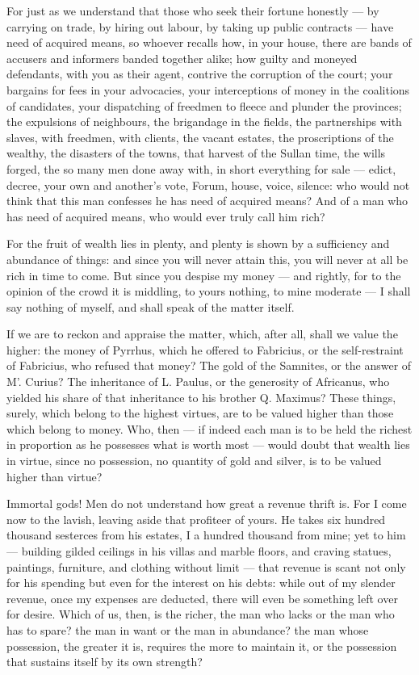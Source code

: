  For just as we understand that those who seek their fortune honestly — by carrying on trade, by hiring out labour, by taking up public contracts — have need of acquired means, so whoever recalls how, in your house, there are bands of accusers and informers banded together alike; how guilty and moneyed defendants, with you as their agent, contrive the corruption of the court; your bargains for fees in your advocacies, your interceptions of money in the coalitions of candidates, your dispatching of freedmen to fleece and plunder the provinces; the expulsions of neighbours, the brigandage in the fields, the partnerships with slaves, with freedmen, with clients, the vacant estates, the proscriptions of the wealthy, the disasters of the towns, that harvest of the Sullan time, the wills forged, the so many men done away with, in short everything for sale — edict, decree, your own and another's vote, Forum, house, voice, silence: who would not think that this man confesses he has need of acquired means? And of a man who has need of acquired means, who would ever truly call him rich?

 For the fruit of wealth lies in plenty, and plenty is shown by a sufficiency and abundance of things: and since you will never attain this, you will never at all be rich in time to come. But since you despise my money — and rightly, for to the opinion of the crowd it is middling, to yours nothing, to mine moderate — I shall say nothing of myself, and shall speak of the matter itself.

 If we are to reckon and appraise the matter, which, after all, shall we value the higher: the money of Pyrrhus, which he offered to Fabricius, or the self-restraint of Fabricius, who refused that money? The gold of the Samnites, or the answer of M'. Curius? The inheritance of L. Paulus, or the generosity of Africanus, who yielded his share of that inheritance to his brother Q. Maximus? These things, surely, which belong to the highest virtues, are to be valued higher than those which belong to money. Who, then — if indeed each man is to be held the richest in proportion as he possesses what is worth most — would doubt that wealth lies in virtue, since no possession, no quantity of gold and silver, is to be valued higher than virtue?

 Immortal gods! Men do not understand how great a revenue thrift is. For I come now to the lavish, leaving aside that profiteer of yours. He takes six hundred thousand sesterces from his estates, I a hundred thousand from mine; yet to him — building gilded ceilings in his villas and marble floors, and craving statues, paintings, furniture, and clothing without limit — that revenue is scant not only for his spending but even for the interest on his debts: while out of my slender revenue, once my expenses are deducted, there will even be something left over for desire. Which of us, then, is the richer, the man who lacks or the man who has to spare? the man in want or the man in abundance? the man whose possession, the greater it is, requires the more to maintain it, or the possession that sustains itself by its own strength?

